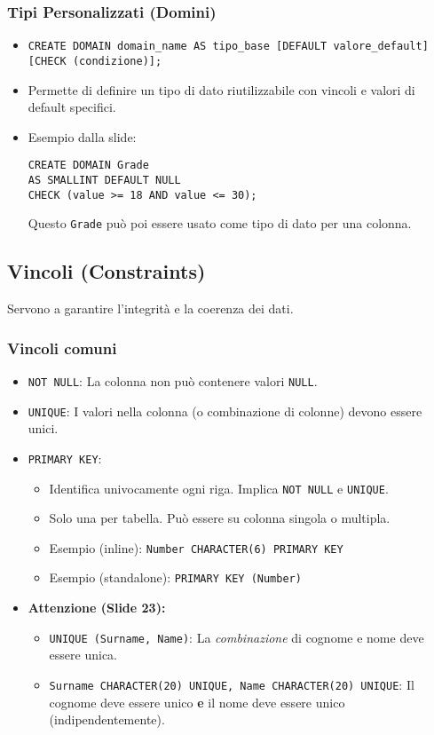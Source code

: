 \subsubsection{Tipi Personalizzati (Domini)}
\begin{itemize}
	\item \texttt{CREATE DOMAIN domain\_name AS tipo\_base [DEFAULT valore\_default] [CHECK (condizione)];}
	\item Permette di definire un tipo di dato riutilizzabile con vincoli e valori di default specifici.
	\item Esempio dalla slide:
	\begin{verbatim}
CREATE DOMAIN Grade
AS SMALLINT DEFAULT NULL
CHECK (value >= 18 AND value <= 30);
	\end{verbatim}
	Questo \texttt{Grade} può poi essere usato come tipo di dato per una colonna.
\end{itemize}

\subsection{Vincoli (Constraints)}
Servono a garantire l'integrità e la coerenza dei dati.
\subsubsection{Vincoli comuni}
\begin{itemize}
	\item \texttt{NOT NULL}: La colonna non può contenere valori \texttt{NULL}.
	\item \texttt{UNIQUE}: I valori nella colonna (o combinazione di colonne) devono essere unici.
	\item \texttt{PRIMARY KEY}:
	\begin{itemize}
		\item Identifica univocamente ogni riga. Implica \texttt{NOT NULL} e \texttt{UNIQUE}.
		\item Solo una per tabella. Può essere su colonna singola o multipla.
		\item Esempio (inline): \texttt{Number CHARACTER(6) PRIMARY KEY}
		\item Esempio (standalone): \texttt{PRIMARY KEY (Number)}
	\end{itemize}
	\item \textbf{Attenzione (Slide 23):}
	\begin{itemize}
		\item \texttt{UNIQUE (Surname, Name)}: La \textit{combinazione} di cognome e nome deve essere unica.
		\item \texttt{Surname CHARACTER(20) UNIQUE, Name CHARACTER(20) UNIQUE}: Il cognome deve essere unico \textbf{e} il nome deve essere unico (indipendentemente).
	\end{itemize}
\end{itemize}
